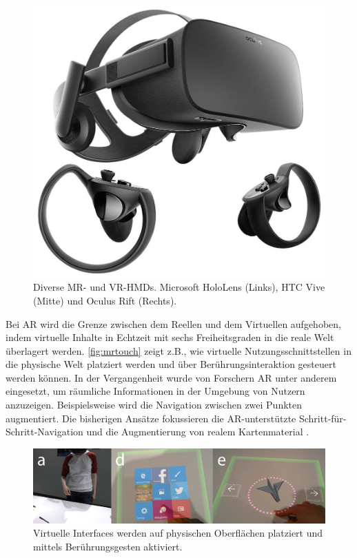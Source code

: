 \begin{figure}[hb]
\begin{minipage}{0.25\textwidth}
        \includegraphics[width=.9\linewidth]{figures/oculus_rift}
    \end{minipage}%
    \caption{Diverse MR- und VR-HMDs. Microsoft HoloLens (Links), HTC Vive (Mitte) und Oculus Rift (Rechts). }
    \label{fig:devices}
\end{figure}

Bei AR wird die Grenze zwischen dem Reellen und dem Virtuellen aufgehoben, indem virtuelle Inhalte in Echtzeit mit sechs Freiheitsgraden in die reale Welt überlagert werden.
\autoref{fig:mrtouch} zeigt z.B., wie virtuelle Nutzungsschnittstellen in die physische Welt platziert werden und über Berührungsinteraktion gesteuert werden können.
In der Vergangenheit wurde von Forschern AR unter anderem eingesetzt, um räumliche Informationen in der Umgebung von Nutzern anzuzeigen.
Beispielsweise wird die Navigation zwischen zwei Punkten augmentiert.
Die bisherigen Ansätze fokussieren die AR-unterstützte Schritt-für-Schritt-Navigation \parencite{Hoellerer1999, Hashish2017, Mulloni2012} und die Augmentierung von realem Kartenmaterial \parencite{Rohs2009, Morrison2009, Reitmayr2005}.
\begin{figure}[ht]
    \centering
    \includegraphics[width=\textwidth]{figures/mrtouch}
    \caption{Virtuelle Interfaces werden auf physischen Oberflächen platziert und mittels Berührungsgesten aktiviert. }
    \label{fig:mrtouch}
\end{figure}


